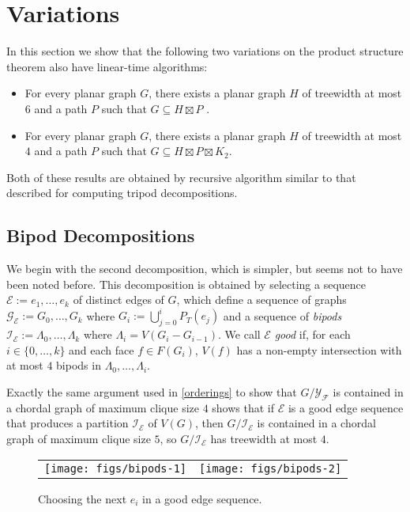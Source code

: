 \documentclass{patmorin}
\begin{document}
\section{Variations}

In this section we show that the following two variations on the product structure theorem also have linear-time algorithms:
\begin{itemize}
  \item For every planar graph $G$, there exists a planar graph $H$ of  treewidth at most $6$ and a path $P$ such that $G\subseteq H\boxtimes P$ \cite{ueckerdt.wood.ea:improved}.
  \item For every planar graph $G$, there exists a planar graph $H$ of treewidth at most $4$ and a path $P$ such that $G\subseteq H\boxtimes P\boxtimes K_2$.
\end{itemize}

Both of these results are obtained by recursive algorithm similar to that described for computing tripod decompositions.

\subsection{Bipod Decompositions}

We begin with the second decomposition, which is simpler, but seems not to have been noted before.  This decomposition is obtained by selecting a sequence $\mathcal{E}:=e_1,\ldots,e_k$ of distinct edges of $G$, which define a sequence of graphs $\mathcal{G_E}:=G_{0},\ldots,G_k$ where $G_i:=\bigcup_{j=0}^i P_T(e_j)$ and a sequence of \emph{bipods} $\mathcal{I_E}:=\Lambda_0,\ldots,\Lambda_k$ where $\Lambda_i=V(G_i-G_{i-1})$.  We call $\mathcal{E}$ \emph{good} if, for each $i\in\{0,\ldots,k\}$ and each face $f\in F(G_i)$, $V(f)$ has a non-empty intersection with at most $4$ bipods in $\Lambda_0,\ldots,\Lambda_i$.

Exactly the same argument used in \cref{orderings} to show that $G/\mathcal{Y_F}$ is contained in a chordal graph of maximum clique size $4$ shows that if $\mathcal{E}$ is a good edge sequence that produces a partition $\mathcal{I_E}$ of $V(G)$, then $G/\mathcal{I_E}$ is contained in a chordal graph of maximum clique size $5$, so $G/\mathcal{I_E}$ has treewidth at most $4$.

\begin{figure}
  \begin{center}
    \begin{tabular}{cc}
      \texttt{[image: figs/bipods-1]} &
      \texttt{[image: figs/bipods-2]}
    \end{tabular}
  \end{center}
  \caption{Choosing the next $e_i$ in a  good edge sequence.}
\end{figure}
\end{document}
